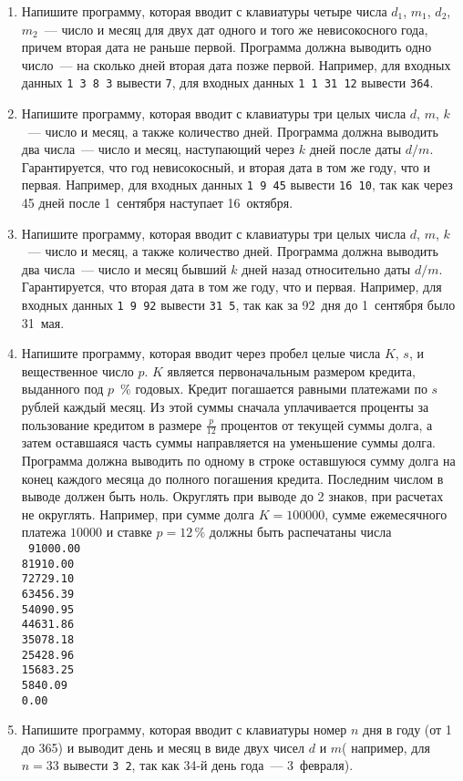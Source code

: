 \documentclass{article}
\begin{document}
\begin{enumerate}[label={}, leftmargin=0pt, itemindent=0pt]
\begin{enumerate}[label=\arabic{enumi}.\arabic*.]
\item
Напишите программу, которая вводит с клавиатуры четыре числа $d_1$, $m_1$, $d_2$, $m_2$~--- число и месяц для двух дат одного и того же невисокосного года, причем вторая дата не раньше первой. Программа должна выводить одно число~--- на сколько дней вторая дата позже первой. Например, для входных данных \texttt{1 3 8 3} вывести \texttt{7}, для входных данных \texttt{1 1 31 12} вывести \texttt{364}.
\item
Напишите программу, которая вводит с клавиатуры три целых числа $d$, $m$, $k$~--- число и месяц, а также количество дней. Программа должна выводить два числа~--- число и месяц, наступающий через $k$ дней после даты $d/m$. Гарантируется, что год невисокосный, и вторая дата в том же году, что и первая. Например, для входных данных \texttt{1 9 45} вывести \texttt{16 10}, так как через 45 дней после 1~сентября наступает 16~октября.
\item
Напишите программу, которая вводит с клавиатуры три целых числа $d$, $m$, $k$~--- число и месяц, а также количество дней. Программа должна выводить два числа~--- число и месяц бывший $k$ дней назад относительно даты $d/m$. Гарантируется, что вторая дата в том же году, что и первая. Например, для входных данных \texttt{1 9 92} вывести \texttt{31 5}, так как за 92~дня до 1~сентября было 31~мая.
\item
Напишите программу, которая вводит через пробел целые числа $K$, $s$, и вещественное число $p$. $K$ является первоначальным размером кредита, выданного под $p$~\% годовых. Кредит погашается равными платежами по $s$ рублей каждый месяц. Из этой суммы сначала уплачивается проценты за пользование кредитом в размере $\frac{p}{12}$ процентов от текущей суммы долга, а затем оставшаяся часть суммы  направляется на уменьшение суммы долга. Программа должна выводить по одному в строке оставшуюся сумму долга на конец каждого месяца до полного погашения кредита. Последним числом в выводе должен быть ноль. Округлять при выводе до 2 знаков, при расчетах не округлять.
Например, при сумме долга $K=100000$, сумме ежемесячного платежа $10000$ и ставке $p=12$\,\%  должны быть распечатаны числа \\
\texttt{
91000.00\\
81910.00\\
72729.10\\
63456.39\\
54090.95\\
44631.86\\
35078.18\\
25428.96\\
15683.25\\
5840.09\\
0.00}
\item
Напишите программу, которая вводит с клавиатуры номер $n$ дня в году (от 1 до 365) и выводит день и месяц в виде двух чисел $d$ и $m$( например, для $n=33$ вывести \texttt{3 2}, так как 34-й день года~--- 3~февраля).


\end{enumerate}
\end{enumerate}
\end{document}
